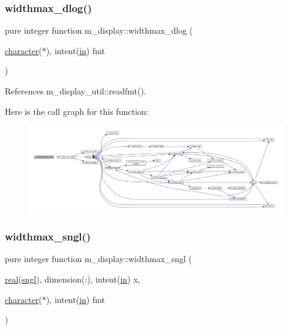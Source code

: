 \subsubsection{\texorpdfstring{widthmax\+\_\+dlog()}{widthmax\_dlog()}}
{\footnotesize\ttfamily pure integer function m\+\_\+display\+::widthmax\+\_\+dlog (\begin{DoxyParamCaption}\item[{\hyperlink{option__stopwatch_83_8txt_abd4b21fbbd175834027b5224bfe97e66}{character}($\ast$), intent(\hyperlink{M__journal_83_8txt_afce72651d1eed785a2132bee863b2f38}{in})}]{fmt }\end{DoxyParamCaption})\hspace{0.3cm}{\ttfamily [private]}}



References m\+\_\+display\+\_\+util\+::readfmt().

Here is the call graph for this function\+:
\nopagebreak
\begin{figure}[H]
\begin{center}
\leavevmode
\includegraphics[width=350pt]{namespacem__display_ac342ada170e8066fa938cf8eb69f09bb_cgraph}
\end{center}
\end{figure}
\mbox{\label{namespacem__display_a3bb36db16c84ea38d1697191adbc027a}} 
\subsubsection{\texorpdfstring{widthmax\+\_\+sngl()}{widthmax\_sngl()}}
{\footnotesize\ttfamily pure integer function m\+\_\+display\+::widthmax\+\_\+sngl (\begin{DoxyParamCaption}\item[{\hyperlink{read__watch_83_8txt_abdb62bde002f38ef75f810d3a905a823}{real}(\hyperlink{namespacem__display_a2ac86bc535c3ccc5947dbb3109c666b5}{sngl}), dimension(\+:), intent(\hyperlink{M__journal_83_8txt_afce72651d1eed785a2132bee863b2f38}{in})}]{x,  }\item[{\hyperlink{option__stopwatch_83_8txt_abd4b21fbbd175834027b5224bfe97e66}{character}($\ast$), intent(\hyperlink{M__journal_83_8txt_afce72651d1eed785a2132bee863b2f38}{in})}]{fmt }\end{DoxyParamCaption})\hspace{0.3cm}{\ttfamily [private]}}



